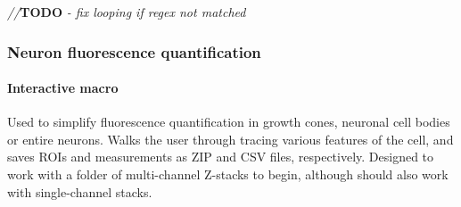 \documentclass[
  12pt,
  a4paper,
]{book}
\newenvironment{Shaded}{}{}
\newcommand{\AlertTok}[1]{\textcolor[rgb]{1.00,0.00,0.00}{\textbf{#1}}}
\newcommand{\CommentTok}[1]{\textcolor[rgb]{0.38,0.63,0.69}{\textit{#1}}}
\begin{document}
\begin{Shaded}
\begin{Highlighting}[]
\CommentTok{//}\AlertTok{TODO}\CommentTok{ {-} fix looping if regex not matched}
\end{Highlighting}
\end{Shaded}

\subsubsection{Neuron fluorescence quantification}\label{neuron-fluorescence-quantification}

\paragraph{Interactive macro}\label{fluor-quant}

Used to simplify fluorescence quantification in growth cones, neuronal cell bodies or entire neurons. Walks the user through tracing various features of the cell, and saves ROIs and measurements as ZIP and CSV files, respectively. Designed to work with a folder of multi-channel Z-stacks to begin, although should also work with single-channel stacks.
\end{document}
